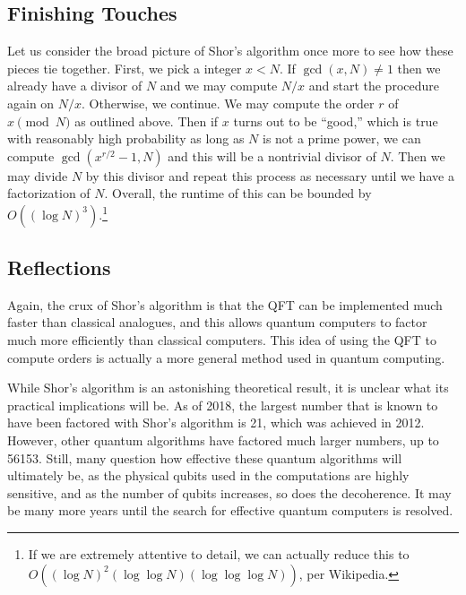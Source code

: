 \documentclass[a4paper]{article}
\newcommand\0{\mathbf{0}}
\newcommand\<{\langle}
\renewcommand\>{\rangle}
\begin{document}
\subsection{Finishing Touches}

Let us consider the broad picture of Shor's algorithm once more to see how these pieces tie together. First, we pick a integer $x < N$. If $\gcd(x,N)\neq 1$ then we already have a divisor of $N$ and we may compute $N/x$ and start the procedure again on $N/x$. Otherwise, we continue. We may compute the order $r$ of $x\pmod{N}$ as outlined above. Then if $x$ turns out to be ``good,'' which is true with reasonably high probability as long as $N$ is not a prime power, we can compute $\gcd(x^{r/2}-1,N)$ and this will be a nontrivial divisor of $N$. Then we may divide $N$ by this divisor and repeat this process as necessary until we have a factorization of $N$. Overall, the runtime of this can be bounded by $O((\log N)^3)$.\footnote{If we are extremely attentive to detail, we can actually reduce this to $O((\log N)^2(\log\log N )(\log\log\log N))$, per Wikipedia.}

\subsection{Reflections}

Again, the crux of Shor's algorithm is that the QFT can be implemented much faster than classical analogues, and this allows quantum computers to factor much more efficiently than classical computers. This idea of using the QFT to compute orders is actually a more general method used in quantum computing.

While Shor's algorithm is an astonishing theoretical result, it is unclear what its practical implications will be. As of 2018, the largest number that is known to have been factored with Shor's algorithm is 21, which was achieved in 2012. However, other quantum algorithms have factored much larger numbers, up to 56153. Still, many question how effective these quantum algorithms will ultimately be, as the physical qubits used in the computations are highly sensitive, and as the number of qubits increases, so does the decoherence. It may be many more years until the search for effective quantum computers is resolved.


\nocite{*}


\end{document}
